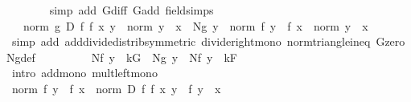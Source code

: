 \begin{isabellebody}
\ \ \ \ \ \ \isamarkupfalse%
\ {\isacharparenleft}{\kern0pt}simp\ add{\isacharcolon}{\kern0pt}\ G{\isachardot}{\kern0pt}diff\ G{\isachardot}{\kern0pt}add\ field{\isacharunderscore}{\kern0pt}simps{\isacharparenright}{\kern0pt}\isanewline
\ \ \ \ \isamarkupfalse%
\ \isamarkupfalse%
\ {\isachardoublequoteopen}{\isasymdots}\ {\isasymle}\ norm\ {\isacharparenleft}{\kern0pt}g{\isacharprime}{\kern0pt}\ {\isacharparenleft}{\kern0pt}{\isacharquery}{\kern0pt}D\ f\ f{\isacharprime}{\kern0pt}\ x\ y{\isacharparenright}{\kern0pt}{\isacharparenright}{\kern0pt}\ {\isacharslash}{\kern0pt}\ norm\ {\isacharparenleft}{\kern0pt}y\ {\isacharminus}{\kern0pt}\ x{\isacharparenright}{\kern0pt}\ {\isacharplus}{\kern0pt}\ Ng\ y\ {\isacharasterisk}{\kern0pt}\ {\isacharparenleft}{\kern0pt}norm\ {\isacharparenleft}{\kern0pt}f\ y\ {\isacharminus}{\kern0pt}\ f\ x{\isacharparenright}{\kern0pt}\ {\isacharslash}{\kern0pt}\ norm\ {\isacharparenleft}{\kern0pt}y\ {\isacharminus}{\kern0pt}\ x{\isacharparenright}{\kern0pt}{\isacharparenright}{\kern0pt}{\isachardoublequoteclose}\isanewline
\ \ \ \ \ \ \isamarkupfalse%
\ {\isacharparenleft}{\kern0pt}simp\ add{\isacharcolon}{\kern0pt}\ add{\isacharunderscore}{\kern0pt}divide{\isacharunderscore}{\kern0pt}distrib{\isacharbrackleft}{\kern0pt}symmetric{\isacharbrackright}{\kern0pt}\ divide{\isacharunderscore}{\kern0pt}right{\isacharunderscore}{\kern0pt}mono\ norm{\isacharunderscore}{\kern0pt}triangle{\isacharunderscore}{\kern0pt}ineq\ G{\isachardot}{\kern0pt}zero\ Ng{\isacharunderscore}{\kern0pt}def{\isacharparenright}{\kern0pt}\isanewline
\ \ \ \ \isamarkupfalse%
\ \isamarkupfalse%
\ {\isachardoublequoteopen}{\isasymdots}\ {\isasymle}\ Nf\ y\ {\isacharasterisk}{\kern0pt}\ kG\ {\isacharplus}{\kern0pt}\ Ng\ y\ {\isacharasterisk}{\kern0pt}\ {\isacharparenleft}{\kern0pt}Nf\ y\ {\isacharplus}{\kern0pt}\ kF{\isacharparenright}{\kern0pt}{\isachardoublequoteclose}\isanewline
\ \ \ \ \isamarkupfalse%
\ {\isacharparenleft}{\kern0pt}intro\ add{\isacharunderscore}{\kern0pt}mono\ mult{\isacharunderscore}{\kern0pt}left{\isacharunderscore}{\kern0pt}mono{\isacharparenright}{\kern0pt}\isanewline
\ \ \ \ \ \ \isamarkupfalse%
\ {\isachardoublequoteopen}norm\ {\isacharparenleft}{\kern0pt}f\ y\ {\isacharminus}{\kern0pt}\ f\ x{\isacharparenright}{\kern0pt}\ {\isacharequal}{\kern0pt}\ norm\ {\isacharparenleft}{\kern0pt}{\isacharquery}{\kern0pt}D\ f\ f{\isacharprime}{\kern0pt}\ x\ y\ {\isacharplus}{\kern0pt}\ f{\isacharprime}{\kern0pt}\ {\isacharparenleft}{\kern0pt}y\ {\isacharminus}{\kern0pt}\ x{\isacharparenright}{\kern0pt}{\isacharparenright}{\kern0pt}{\isachardoublequoteclose}\isanewline

\end{isabellebody}
